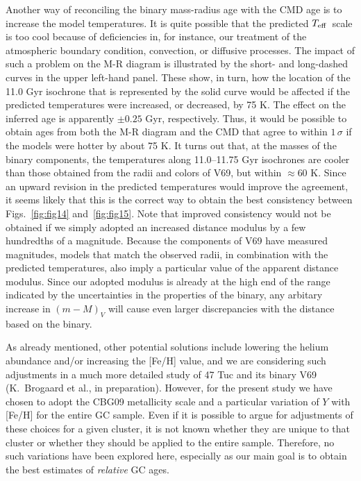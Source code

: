 \documentclass[12pt,preprint]{aastex}
\newcommand\teff{{T_{\rm eff}}}
\begin{document}
Another way of reconciling the binary mass-radius age with the CMD age is
to increase the model temperatures.  It is quite possible that the predicted
$\teff$\ scale is too cool because of deficiencies in, for instance, our
treatment of the atmospheric boundary condition, convection, or diffusive
processes.  The impact of such a problem on the M-R diagram is illustrated by
the short- and long-dashed curves in the upper left-hand panel.  These show, in
turn, how the location of the 11.0 Gyr isochrone that is represented by the
solid curve would be affected if the predicted temperatures were increased, or
decreased, by 75 K.  The effect on the inferred age is apparently $\pm 0.25$
Gyr, respectively.  Thus, it would be possible to obtain ages from both
the M-R diagram and the CMD that agree to within $1\,\sigma$ if the models were
hotter by about 75 K.  It turns out that, at the masses of the binary
components, the temperatures along 11.0--11.75 Gyr isochrones are cooler than
those obtained from the radii and colors of V69, but within $\approx 60$ K.
Since an upward revision in the predicted temperatures would improve the
agreement, it seems likely that this is the correct way to obtain the best
consistency between Figs.~\ref{fig:fig14} and~\ref{fig:fig15}.  Note that
improved consistency would not be obtained if we simply adopted an increased
distance modulus by a few hundredths of a magnitude.   Because the components
of V69 have measured magnitudes, models that match the observed radii, in
combination with the predicted temperatures, also imply a particular value of
the apparent distance modulus.  Since our adopted modulus is already at the
high end of the range indicated by the uncertainties in the properties of the
binary, any arbitary increase in $(m-M)_V$ will cause even larger discrepancies
with the distance based on the binary.

As already mentioned, other potential solutions include lowering the helium
abundance and/or increasing the [Fe/H] value, and we are considering such
adjustments in a much more detailed study of 47 Tuc and its binary V69
(K.~Brogaard et al., in preparation).  However, for the present study we have
chosen to adopt the CBG09 metallicity scale and a particular variation of $Y$
with [Fe/H] for the entire GC sample.  Even if it is possible to argue for
adjustments of these choices for a given cluster, it is not known whether they
are unique to that cluster or whether they should be applied to the entire
sample.  Therefore, no such variations have been explored here, especially as
our main goal is to obtain the best estimates of {\it relative} GC ages.
\end{document}
